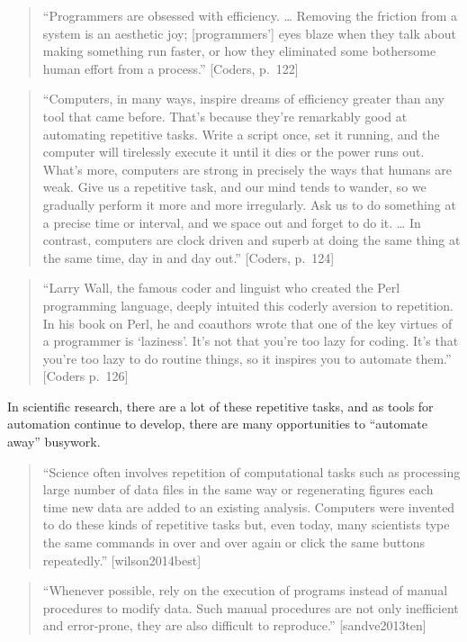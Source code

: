 \documentclass[]{tufte-book}
\begin{document}
\begin{quote}
``Programmers are obsessed with efficiency. \ldots{} Removing the friction
from a system is an aesthetic joy; {[}programmers'{]} eyes blaze when they
talk about making something run faster, or how they eliminated some
bothersome human effort from a process.'' {[}Coders, p.~122{]}
\end{quote}

\begin{quote}
``Computers, in many ways, inspire dreams of efficiency greater than
any tool that came before. That's because they're remarkably good at
automating repetitive tasks. Write a script once, set it running, and
the computer will tirelessly execute it until it dies or the power
runs out. What's more, computers are strong in precisely the ways that
humans are weak. Give us a repetitive task, and our mind tends to
wander, so we gradually perform it more and more irregularly. Ask us
to do something at a precise time or interval, and we space out and
forget to do it. \ldots{} In contrast, computers are clock driven and superb
at doing the same thing at the same time, day in and day out.''
{[}Coders, p.~124{]}
\end{quote}

\begin{quote}
``Larry Wall, the famous coder and linguist who created the Perl
programming language, deeply intuited this coderly aversion to
repetition. In his book on Perl, he and coauthors wrote that one of the
key virtues of a programmer is `laziness'. It's not that you're too lazy
for coding. It's that you're too lazy to do routine things, so it
inspires you to automate them.'' {[}Coders p.~126{]}
\end{quote}

In scientific research, there are a lot of these repetitive tasks, and as tools for
automation continue to develop, there are many opportunities to ``automate away'' busywork.

\begin{quote}
``Science often involves repetition of computational tasks such as processing
large number of data files in the same way or regenerating figures each time
new data are added to an existing analysis. Computers were invented to do these
kinds of repetitive tasks but, even today, many scientists type the same
commands in over and over again or click the same buttons repeatedly.'' {[}wilson2014best{]}
\end{quote}

\begin{quote}
``Whenever possible, rely on the execution of programs instead of manual procedures
to modify data. Such manual procedures are not only inefficient and error-prone,
they are also difficult to reproduce.'' {[}sandve2013ten{]}
\end{quote}
\end{document}
